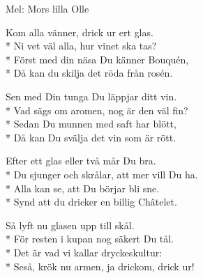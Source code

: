 \begin{SongText}
    \begin{SongInfo}
        Mel: Mors lilla Olle
    \end{SongInfo}
    \begin{SongVerse}
        Kom alla vänner, drick ur ert glas.\\*%
        Ni vet väl alla, hur vinet ska tas?\\*%
        Först med din näsa Du känner Bouquén,\\*%
        Då kan du skilja det röda från rosén.
    \end{SongVerse}
    \begin{SongVerse}
        Sen med Din tunga Du läppjar ditt vin.\\*%
        Vad sägs om aromen, nog är den väl fin?\\*%
        Sedan Du munnen med saft har blött,\\*%
        Då kan Du svälja det vin som är rött.
    \end{SongVerse}
    \begin{SongVerse}
        Efter ett glas eller två mår Du bra.\\*%
        Du sjunger och skrålar, att mer vill Du ha.\\*%
        Alla kan se, att Du börjar bli sne.\\*%
        Synd att du dricker en billig Châtelet.
    \end{SongVerse}
    \begin{SongVerse}
        Så lyft nu glasen upp till skål.\\*%
        För resten i kupan nog säkert Du tål.\\*%
        Det är vad vi kallar dryckeskultur:\\*%
        Seså, krök nu armen, ja drickom, drick ur!
    \end{SongVerse}
\end{SongText}
